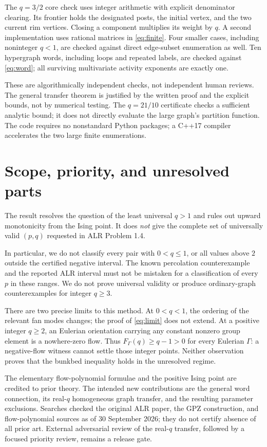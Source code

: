 \documentclass[11pt,a4paper]{article}
\theoremstyle{remark}\newtheorem{remark}[theorem]{Remark}
\begin{document}
The $q=3/2$ core check uses integer arithmetic with explicit denominator clearing. Its frontier holds the designated posts, the initial vertex, and the two current rim vertices. Closing a component multiplies its weight by $q$. A second implementation uses rational matrices in \eqref{eq:finite}. Four smaller cases, including noninteger $q<1$, are checked against direct edge-subset enumeration as well. Ten hypergraph words, including loops and repeated labels, are checked against \eqref{eq:word}; all surviving multivariate activity exponents are exactly one.

These are algorithmically independent checks, not independent human reviews. The general transfer theorem is justified by the written proof and the explicit bounds, not by numerical testing. The $q=21/10$ certificate checks a sufficient analytic bound; it does not directly evaluate the large graph's partition function. The code requires no nonstandard Python packages; a C++17 compiler accelerates the two large finite enumerations.

\section{Scope, priority, and unresolved parts}
The result resolves the question of the least universal $q>1$ and rules out upward monotonicity from the Ising point. It does \emph{not} give the complete set of universally valid $(p,q)$ requested in ALR Problem 1.4.

In particular, we do not classify every pair with $0<q\le1$, or all values above $2$ outside the certified negative interval. The known percolation counterexample and the reported ALR interval must not be mistaken for a classification of every $p$ in these ranges. We do not prove universal validity or produce ordinary-graph counterexamples for integer $q\ge3$.

There are two precise limits to this method. At $0<q<1$, the ordering of the relevant fan modes changes; the proof of \eqref{eq:limit} does not extend. At a positive integer $q\ge2$, an Eulerian orientation carrying any constant nonzero group element is a nowhere-zero flow. Thus $F_\Gamma(q)\ge q-1>0$ for every Eulerian $\Gamma$: a negative-flow witness cannot settle those integer points. Neither observation proves that the bunkbed inequality holds in the unresolved regime.

The elementary flow-polynomial formulae and the positive Ising point are credited to prior theory. The intended new contributions are the general word connection, its real-$q$ homogeneous graph transfer, and the resulting parameter exclusions. Searches checked the original ALR paper, the GPZ construction, and flow-polynomial sources as of 30 September 2026; they do not certify absence of all prior art. External adversarial review of the real-$q$ transfer, followed by a focused priority review, remains a release gate.
\end{document}
